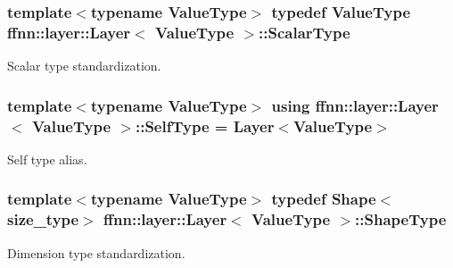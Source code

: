 \hypertarget{classffnn_1_1layer_1_1_layer_a3d482813f86f1ec69554b4592c478c32}{
\subsubsection[{Scalar\-Type}]{\setlength{\rightskip}{0pt plus 5cm}template$<$typename Value\-Type$>$ typedef Value\-Type {\bf ffnn\-::layer\-::\-Layer}$<$ Value\-Type $>$\-::{\bf Scalar\-Type}}}\label{classffnn_1_1layer_1_1_layer_a3d482813f86f1ec69554b4592c478c32}


Scalar type standardization. 

\hypertarget{classffnn_1_1layer_1_1_layer_a01db5ce644b97af72dca31a759aa33c5}{
\subsubsection[{Self\-Type}]{\setlength{\rightskip}{0pt plus 5cm}template$<$typename Value\-Type$>$ using {\bf ffnn\-::layer\-::\-Layer}$<$ Value\-Type $>$\-::{\bf Self\-Type} =  {\bf Layer}$<$Value\-Type$>$}}\label{classffnn_1_1layer_1_1_layer_a01db5ce644b97af72dca31a759aa33c5}


Self type alias. 

\hypertarget{classffnn_1_1layer_1_1_layer_ae2f2d0063ab4b2c2a3a6ebf81f4ec32f}{
\subsubsection[{Shape\-Type}]{\setlength{\rightskip}{0pt plus 5cm}template$<$typename Value\-Type$>$ typedef {\bf Shape}$<${\bf size\-\_\-type}$>$ {\bf ffnn\-::layer\-::\-Layer}$<$ Value\-Type $>$\-::{\bf Shape\-Type}}}\label{classffnn_1_1layer_1_1_layer_ae2f2d0063ab4b2c2a3a6ebf81f4ec32f}


Dimension type standardization. 



